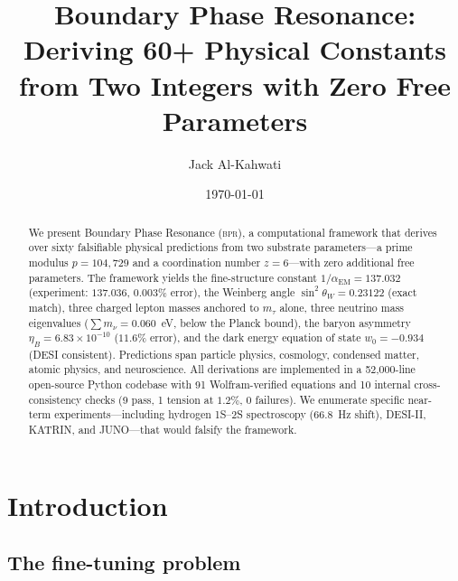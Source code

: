 \documentclass[aps,prd,twocolumn,superscriptaddress,longbibliography,nofootinbib]{revtex4-2}
\newcommand{\sinW}{\sin^2\!\theta_W}
\newcommand{\alphaEM}{\alpha_{\mathrm{EM}}}
\newcommand{\bpr}{\textsc{bpr}}
\begin{document}
\title{Boundary Phase Resonance: Deriving 60+ Physical Constants\\
from Two Integers with Zero Free Parameters}

\author{Jack Al-Kahwati}

\date{\today}

\begin{abstract}
We present Boundary Phase Resonance (\bpr), a computational framework
that derives over sixty falsifiable physical predictions from two
substrate parameters---a prime modulus $p = 104{,}729$ and a
coordination number $z = 6$---with zero additional free parameters.
The framework yields the fine-structure constant
$1/\alphaEM = 137.032$ (experiment: $137.036$, $0.003\%$ error),
the Weinberg angle $\sinW = 0.23122$ (exact match), three charged
lepton masses anchored to $m_\tau$ alone, three neutrino mass
eigenvalues ($\sum m_\nu = 0.060$~eV, below the Planck bound), the
baryon asymmetry $\eta_B = 6.83 \times 10^{-10}$ ($11.6\%$ error),
and the dark energy equation of state $w_0 = -0.934$ (DESI
consistent).  Predictions span particle physics, cosmology,
condensed matter, atomic physics, and neuroscience.  All derivations
are implemented in a 52{,}000-line open-source Python codebase with
91 Wolfram-verified equations and 10 internal cross-consistency
checks (9 pass, 1 tension at $1.2\%$, 0 failures).  We enumerate
specific near-term experiments---including hydrogen 1S--2S
spectroscopy (66.8~Hz shift), DESI-II, KATRIN, and JUNO---that
would falsify the framework.
\end{abstract}

\maketitle


\section{Introduction}
\label{sec:intro}

\subsection{The fine-tuning problem}
\end{document}
